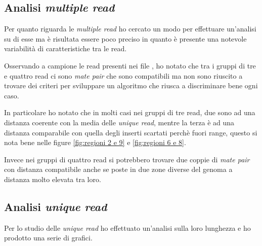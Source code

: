 \subsection{Analisi \emph{multiple read}}
Per quanto riguarda le \emph{multiple read} ho cercato un modo per effettuare un'analisi su di esse ma è risultata essere poco preciso in quanto è presente una notevole variabilità di caratteristiche tra le read.

Osservando a campione le read presenti nei file , ho notato che tra i gruppi di tre e quattro read ci sono \emph{mate pair} che sono compatibili ma non sono riuscito a trovare dei criteri per sviluppare un algoritmo che riusca a discriminare bene ogni caso.

In particolare ho notato che in molti casi nei gruppi di tre read, due sono ad una distanza coerente con la media delle \emph{unique read}, mentre la terza è ad una distanza comparabile con quella degli inserti scartati perchè fuori range, questo si nota bene nelle figure \ref{fig:regioni 2 e 9} e \ref{fig:regioni 6 e 8}.

Invece nei gruppi di quattro read si potrebbero trovare due coppie di \emph{mate pair} con distanza compatibile anche se poste in due zone diverse del genoma a distanza molto elevata tra loro.

\subsection{Analisi \emph{unique read}}
Per lo studio delle \emph{unique read} ho effettuato un'analisi sulla loro lunghezza e ho prodotto una serie di grafici.

